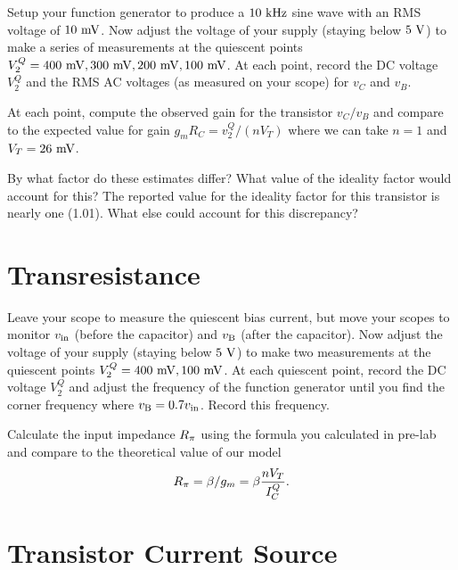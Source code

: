 \documentclass[12pt]{article}
\begin{document}
Setup your function generator to produce a $10~\rm kHz$ sine wave with an RMS voltage of $10~\rm mV$.  Now adjust the voltage of your supply (staying below $5~\rm V$) to make a series of measurements at the quiescent points $V_2^Q=400~\rm mV, 300~\rm mV, 200~\rm mV, 100~\rm mV$.  At each point, record the DC voltage $V_2^Q$ and the RMS AC voltages (as measured on your scope) for $v_C$ and $v_B$.  

At each point, compute the observed gain for the transistor $v_C/v_B$ and compare to the expected value for gain $g_m R_C = v_2^Q / (n V_T)$ where we can take $n=1$ and $V_T=26~\rm mV$.

By what factor do these estimates differ?  What value of the ideality factor would account for this?  The reported value for the ideality factor for this transistor is nearly one (1.01).  What else could account for this discrepancy?

\section{Transresistance}

Leave your scope to measure the quiescent bias current, but move your scopes to monitor $v_{\rm in}$ (before the capacitor) and $v_{\rm B}$ (after the capacitor).  Now adjust the voltage of your supply (staying below $5~\rm V$) to make two measurements at the quiescent points $V_2^Q=400~\rm mV, 100~\rm mV$.  At each quiescent point, record the DC voltage $V_2^Q$ and adjust the frequency of the function generator until you find the corner frequency where $v_{\rm B} = 0.7 v_{\rm in}$.  Record this frequency.

Calculate the input impedance $R_{\rm \pi}$ using the formula you calculated in pre-lab and compare to the theoretical value of our model 
\begin{displaymath}
R_{\rm \pi} = \beta/g_m = \beta \frac{n V_T} { I_C^Q}.
\end{displaymath}

\section{Transistor Current Source}
\end{document}
